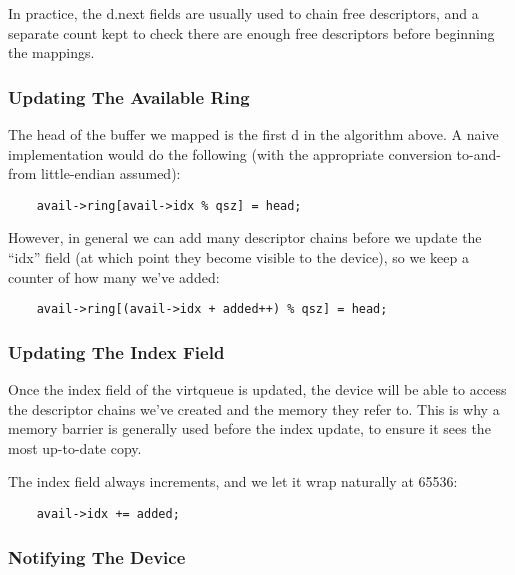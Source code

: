 In practice, the d.next fields are usually used to chain free
descriptors, and a separate count kept to check there are enough
free descriptors before beginning the mappings.

\subsubsection{Updating The Available Ring}\label{sec:General Initialization And Device Operation / Device Operation / Supplying Buffers to The Device / Updating The Available Ring}

The head of the buffer we mapped is the first d in the algorithm
above. A naive implementation would do the following (with the
appropriate conversion to-and-from little-endian assumed):

\begin{lstlisting}
	avail->ring[avail->idx % qsz] = head;
\end{lstlisting}

However, in general we can add many descriptor chains before we update
the “idx” field (at which point they become visible to the
device), so we keep a counter of how many we've added:

\begin{lstlisting}
	avail->ring[(avail->idx + added++) % qsz] = head;
\end{lstlisting}

\subsubsection{Updating The Index Field}\label{sec:General Initialization And Device Operation / Device Operation / Supplying Buffers to The Device / Updating The Index Field}

Once the index field of the virtqueue is updated, the device will
be able to access the descriptor chains we've created and the
memory they refer to. This is why a memory barrier is generally
used before the index update, to ensure it sees the most up-to-date
copy.

The index field always increments, and we let it wrap naturally at
65536:

\begin{lstlisting}
	avail->idx += added;
\end{lstlisting}

\subsubsection{Notifying The Device}\label{sec:General Initialization And Device Operation / Device Operation / Supplying Buffers to The Device / Notifying The Device}


